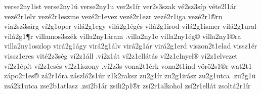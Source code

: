 {verse2ny1ist
verse2ny1ú
verse2ny1u
ver2s1ír
ver2s3szak
vé2sz3síp
véte2l1ár
vezé2r1elv
vezé2r1eszme
vezé2r1evez
vezé2r1ezr
vezé2r1iga
vezé2r1®rn
via2sz3sárg
ví2g1oper
vilá2g1egy
vilá2g1égés
vilá2g1irod
vilá2g1ismer
vilá2g1ural
vilá2g1¶r
villamos3szék
villa2ny1áram
.villa2ny1e
villa2ny1ég®
villa2ny1®ra
villa2ny1oszlop
virá2g1ágy
virá2g1álv
virá2g1ár
virá2g1erd
viszon2t1elad
vissz1ér
vissz1eres
vité2z3ség
ví2z1áll
.ví2z1át
ví2z1ellátás
ví2z1elnyel®
ví2z1elvezet
ví2z1épít
ví2z1esés
ví2z1iszony
.ví2z3s
vona2t1érk
vona2t1ind
vörö2s1®r
wat2t1
zápo2r1es®
zá2r1óra
zászló2s1úr
z1k2raksz %
zu2g1ír
zu2g1irász
zu2g1utca
.zu2g1ü
zsá2k1utca
zse2b1atlasz
.zsi2b1ár
zsili2p1®r
zsí2r1alkohol
zsí2r1ellát
zsoltá2r1ír
}
\endgroup
